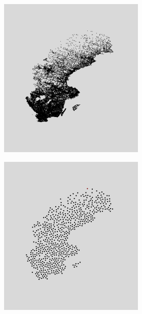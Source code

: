 \begin{figure}[H]
	\begin{subfigure}[b]{1\linewidth}
		\centering
	\begin{subfigure}[b]{0.29\linewidth}
		\centering
		\includegraphics[width=0.9\linewidth]{Pictures/sweden} 
		\caption{} 
		\label{fig:sweden2} 
		\vspace{4ex}
	\end{subfigure}%
	\begin{subfigure}[b]{0.29\linewidth}
		\centering
		\includegraphics[width=0.9\linewidth]{Pictures/bp5_1_sweden} 

\end{subfigure}
\end{subfigure}
\end{figure}
